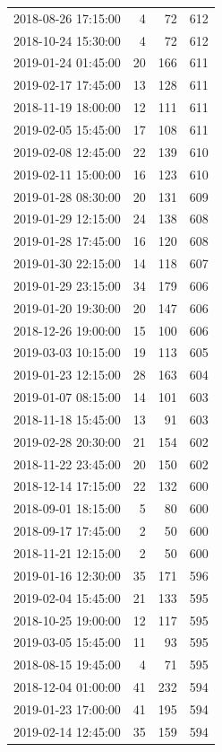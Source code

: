 \begin{tabular}{lrrr}
2018-08-26 17:15:00 & 4 & 72 & 612 \\
2018-10-24 15:30:00 & 4 & 72 & 612 \\
2019-01-24 01:45:00 & 20 & 166 & 611 \\
2019-02-17 17:45:00 & 13 & 128 & 611 \\
2018-11-19 18:00:00 & 12 & 111 & 611 \\
2019-02-05 15:45:00 & 17 & 108 & 611 \\
2019-02-08 12:45:00 & 22 & 139 & 610 \\
2019-02-11 15:00:00 & 16 & 123 & 610 \\
2019-01-28 08:30:00 & 20 & 131 & 609 \\
2019-01-29 12:15:00 & 24 & 138 & 608 \\
2019-01-28 17:45:00 & 16 & 120 & 608 \\
2019-01-30 22:15:00 & 14 & 118 & 607 \\
2019-01-29 23:15:00 & 34 & 179 & 606 \\
2019-01-20 19:30:00 & 20 & 147 & 606 \\
2018-12-26 19:00:00 & 15 & 100 & 606 \\
2019-03-03 10:15:00 & 19 & 113 & 605 \\
2019-01-23 12:15:00 & 28 & 163 & 604 \\
2019-01-07 08:15:00 & 14 & 101 & 603 \\
2018-11-18 15:45:00 & 13 & 91 & 603 \\
2019-02-28 20:30:00 & 21 & 154 & 602 \\
2018-11-22 23:45:00 & 20 & 150 & 602 \\
2018-12-14 17:15:00 & 22 & 132 & 600 \\
2018-09-01 18:15:00 & 5 & 80 & 600 \\
2018-09-17 17:45:00 & 2 & 50 & 600 \\
2018-11-21 12:15:00 & 2 & 50 & 600 \\
2019-01-16 12:30:00 & 35 & 171 & 596 \\
2019-02-04 15:45:00 & 21 & 133 & 595 \\
2018-10-25 19:00:00 & 12 & 117 & 595 \\
2019-03-05 15:45:00 & 11 & 93 & 595 \\
2018-08-15 19:45:00 & 4 & 71 & 595 \\
2018-12-04 01:00:00 & 41 & 232 & 594 \\
2019-01-23 17:00:00 & 41 & 195 & 594 \\
2019-02-14 12:45:00 & 35 & 159 & 594 \\

\end{tabular}
